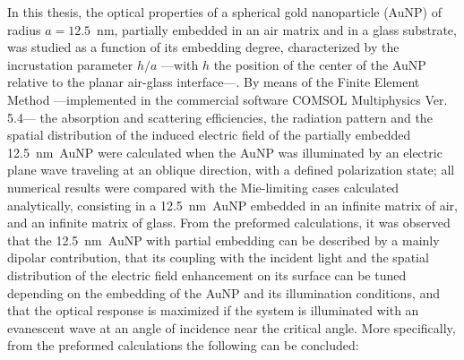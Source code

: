 
In this thesis, the  optical properties of a spherical gold nanoparticle (AuNP) of radius $a = 12.5$~nm, partially embedded in an air matrix and in a glass substrate, was studied as a function of its embedding degree, characterized by the incrustation parameter $h/a$ ---with $h$ the position of the center of the AuNP relative to the planar air-glass interface---. By means of the Finite Element Method ---implemented in the commercial software COMSOL Multiphysics\texttrademark{} Ver. 5.4--- the absorption and scattering efficiencies, the radiation pattern and the spatial distribution of the induced electric field of the partially embedded 12.5~nm~AuNP were calculated when the AuNP was illuminated by an electric plane wave traveling at an oblique direction, with a defined polarization state; all numerical results were compared with the Mie-limiting cases calculated analytically, consisting in a 12.5~nm~AuNP embedded in an infinite matrix of air, and an infinite matrix of glass. From the preformed calculations, it was observed that the 12.5~nm~AuNP with partial embedding can be described by a mainly dipolar contribution, that its coupling with the incident light and the spatial distribution of the electric field enhancement on its surface can be tuned depending on the embedding of the AuNP and its illumination conditions, and that the optical response is maximized if the system is illuminated with an evanescent wave at an angle of incidence near the critical angle. More specifically, from the preformed  calculations the following can be concluded:

